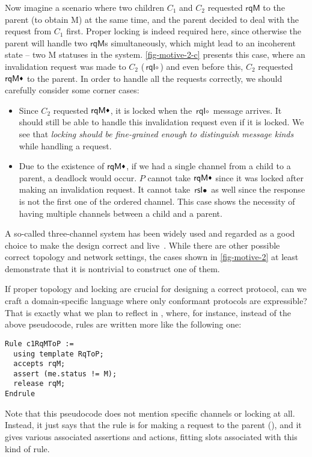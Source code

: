 Now imagine a scenario where two children $C_1$ and $C_2$ requested $\textsf{rqM}$ to the parent (to obtain M) at the same time, and the parent decided to deal with the request from $C_1$ first.
Proper locking is indeed required here, since otherwise the parent will handle two $\textsf{rqM}$s simultaneously, which might lead to an incoherent state -- two M statuses in the system.
\autoref{fig-motive-2-c} presents this case, where an invalidation request was made to $C_2$ ($\textsf{rqI}\circ$) and even before this, $C_2$ requested $\textsf{rqM}\blackdiamond$ to the parent.
In order to handle all the requests correctly, we should carefully consider some corner cases:
\begin{itemize}[leftmargin=*]
\item Since $C_2$ requested $\textsf{rqM}\blackdiamond$, it is locked when the $\textsf{rqI}\circ$ message arrives. It should still be able to handle this invalidation request even if it is locked. We see that \emph{locking should be fine-grained enough to distinguish message kinds} while handling a request.
\item Due to the existence of $\textsf{rqM}\blackdiamond$, if we had a single channel from a child to a parent, a deadlock would occur. $P$ cannot take $\textsf{rqM}\blackdiamond$ since it was locked after making an invalidation request. It cannot take $\textsf{rsI}\bullet$ as well since the response is not the first one of the ordered channel. This case shows the necessity of having multiple channels between a child and a parent.
\end{itemize}

A so-called three-channel system has been widely used and regarded as a good choice to make the design correct and live~\cite{Murali:2015,thesis:Murali:2016}.
While there are other possible correct topology and network settings, the cases shown in \autoref{fig-motive-2} at least demonstrate that it is nontrivial to construct one of them.

If proper topology and locking are crucial for designing a correct protocol, can we craft a domain-specific language where only conformant protocols are expressible?
That is exactly what we plan to reflect in \hemiola{}, where, for instance, instead of the above pseudocode, rules are written more like the following one:
\begin{lstlisting}
Rule c1RqMToP :=
  using template RqToP;
  accepts rqM;
  assert (me.status != M);
  release rqM;
Endrule
\end{lstlisting}
Note that this pseudocode does not mention specific channels or locking at all.
Instead, it just says that the rule is for making a request to the parent (), and it gives various associated assertions and actions, fitting slots associated with this kind of rule.

